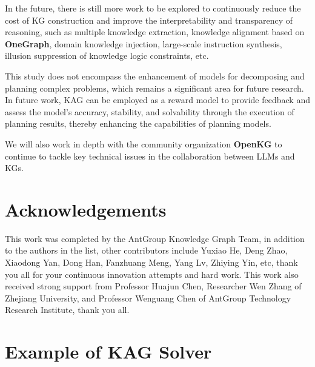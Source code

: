 \documentclass{article}
\begin{document}
In the future, there is still more work to be explored to continuously reduce the cost of KG construction and improve the interpretability and transparency of reasoning, such as multiple knowledge extraction, knowledge alignment based on \textbf{OneGraph}, domain knowledge injection, large-scale instruction synthesis, illusion suppression of knowledge logic constraints, etc. \newline

This study does not encompass the enhancement of models for decomposing and planning complex problems, which remains a significant area for future research. In future work, KAG can be employed as a reward model to provide feedback and assess the model's accuracy, stability, and solvability through the execution of planning results, thereby enhancing the capabilities of planning models. \newline

We will also work in depth with the community organization \textbf{OpenKG} to continue to tackle key technical issues in the collaboration between LLMs and KGs.

\section{Acknowledgements}
This work was completed by the AntGroup Knowledge Graph Team, in addition to the authors in the list, other contributors include Yuxiao He, Deng Zhao, Xiaodong Yan, Dong Han, Fanzhuang Meng, Yang Lv, Zhiying Yin, etc, thank you all for your continuous innovation attempts and hard work. This work also received strong support from Professor Huajun Chen, Researcher Wen Zhang of Zhejiang University, and Professor Wenguang Chen of AntGroup Technology Research Institute, thank you all.

 

\clearpage
\appendix
\section{Example of KAG Solver}
\end{document}
